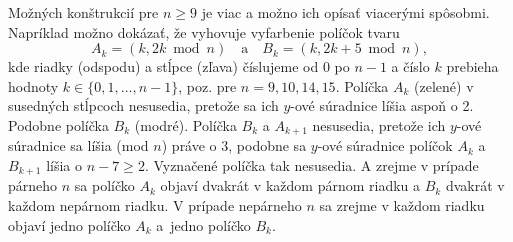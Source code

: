 {\poznamka
Možných konštrukcií pre $n\ge 9$ je viac a možno ich opísať viacerými spôsobmi. Napríklad možno dokázať, že vyhovuje vyfarbenie políčok tvaru
$$
A_k=(k,2k\bmod n)\quad\text{a}\quad B_k=(k,2k+5\bmod n),
$$
kde riadky (odspodu) a stĺpce (zľava) číslujeme od $0$ po $n-1$ a číslo $k$ prebieha hodnoty $k\in\{0,1,\ldots,n-1\}$, poz. \obr{} pre $n=9, 10, 14, 15$.  Políčka $A_k$ (zelené) v susedných stĺpcoch nesusedia, pretože sa ich $y$-ové súradnice líšia aspoň o 2. Podobne políčka $B_k$ (modré). Políčka $B_k$ a $A_{k+1}$ nesusedia, pretože ich $y$-ové súradnice sa líšia (mod $n$) práve o 3, podobne sa $y$-ové súradnice políčok $A_k$ a $B_{k+1}$ líšia o $n-7\ge2$. Vyznačené políčka tak nesusedia. A zrejme v prípade párneho $n$ sa políčko $A_k$ objaví dvakrát v každom párnom riadku a $B_k$ dvakrát v každom nepárnom riadku. V prípade nepárneho $n$ sa zrejme v každom riadku objaví jedno políčko $A_k$ a~jedno políčko $B_k$.
%
}

